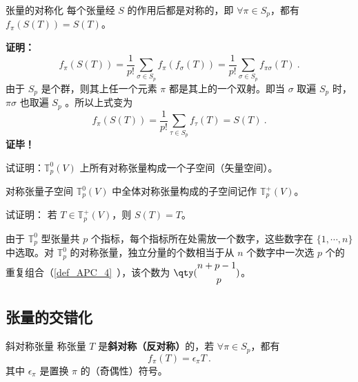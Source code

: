 \begin{theorem}{张量的对称化}
每个张量经 $S$ 的作用后都是对称的，即 $\forall \pi\in S_p$，都有 $f_\pi(S(T))=S(T)$。
\end{theorem}
\textbf{证明：}
\begin{equation}
f_\pi(S(T))=\frac{1}{p!}\sum_{\sigma\in S_p} f_\pi(f_\sigma(T))=\frac{1}{p!}\sum_{\sigma\in S_p} f_{\pi\sigma}(T)~.
\end{equation}
由于 $S_p$ 是个群，则其上任一个元素 $\pi$ 都是其上的一个双射。即当 $\sigma$ 取遍 $S_p$ 时，$\pi\sigma$ 也取遍 $S_p$ 。所以上式变为
\begin{equation}
f_\pi(S(T))=\frac{1}{p!}\sum_{\tau\in S_p} f_{\tau}(T)=S(T)~.
\end{equation}
\textbf{证毕！}

\begin{exercise}{}
试证明：$\mathbb{T}_p^0(V)$ 上所有对称张量构成一个子空间（矢量空间）。
\end{exercise}
\begin{definition}{对称张量子空间}
$\mathbb{T}_p^0(V)$ 中全体对称张量构成的子空间记作 $\mathbb{T}_p^+(V)$。
\end{definition}
\begin{exercise}{}
试证明： 若 $T\in\mathbb{T}_p^+(V)$，则 $S(T)=T$。
\end{exercise}

由于 $\mathbb{T}_p^0$ 型张量共 $p$ 个指标，每个指标所在处需放一个数字，这些数字在 $\{1,\cdots,n\}$ 中选取。对 $\mathbb{T}_p^0$ 的对称张量，独立分量的个数相当于从 $n$ 个数字中一次选 $p$ 个的重复组合（\autoref{def_APC_4}~），该个数为 $\qty(\begin{aligned}
&n+p-1\\&\qquad p
\end{aligned})$。
\subsection{张量的交错化}
\begin{definition}{斜对称张量}
称张量 $T$ 是\textbf{斜对称（反对称）}的，若 $\forall \pi\in S_p$，都有
\begin{equation}\label{eq_SIofTe_4}
f_\pi(T)=\epsilon_\pi T~.
\end{equation}
其中 $\epsilon_\pi$ 是置换 $\pi$ 的（奇偶性）符号。
\end{definition}

